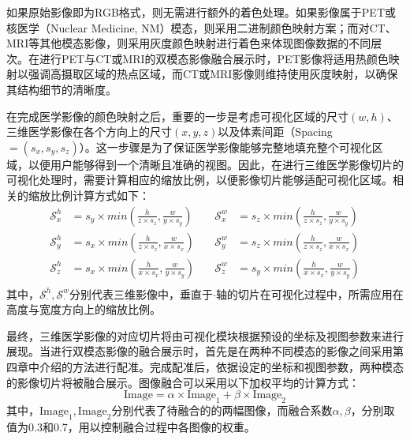 如果原始影像即为RGB格式，则无需进行额外的着色处理。如果影像属于PET或核医学（Nuclear Medicine, NM）模态，则采用二进制颜色映射方案；而对CT、MRI等其他模态影像，则采用灰度颜色映射进行着色来体现图像数据的不同层次。在进行PET与CT或MRI的双模态影像融合展示时，PET影像将适用热颜色映射以强调高摄取区域的热点区域，而CT或MRI影像则维持使用灰度映射，以确保其结构细节的清晰度。

在完成医学影像的颜色映射之后，重要的一步是考虑可视化区域的尺寸\((w,h)\)、三维医学影像在各个方向上的尺寸\((x,y,z)\)以及体素间距（Spacing\(=(s_x,s_y,s_z)\)）。这一步骤是为了保证医学影像能够完整地填充整个可视化区域，以便用户能够得到一个清晰且准确的视图。因此，在进行三维医学影像切片的可视化处理时，需要计算相应的缩放比例，以便影像切片能够适配可视化区域。相关的缩放比例计算方式如下：
\begin{equation}
    \begin{aligned}
        \mathcal{S}_x^{h} & = s_y \times min(\frac{h}{z \times s_z}, \frac{w}{y \times s_y}) & \quad \mathcal{S}_x^{w} & = s_z \times min(\frac{h}{z \times s_z}, \frac{w}{y \times s_y}) \\
        \mathcal{S}_y^{h} & = s_x \times min(\frac{h}{z \times s_z}, \frac{w}{x \times s_x}) & \quad \mathcal{S}_y^{w} & = s_z \times min(\frac{h}{z \times s_z}, \frac{w}{x \times s_x}) \\
        \mathcal{S}_z^{h} & = s_x \times min(\frac{h}{x \times s_x}, \frac{w}{y \times s_y}) & \quad \mathcal{S}_z^{w} & = s_y \times min(\frac{h}{x \times s_x}, \frac{w}{y \times s_y}) \\
    \end{aligned}
    \label{eq:chap05_scale}
\end{equation}
其中，\(\mathcal{S}_\cdot^{h},\mathcal{S}_\cdot^{w}\)分别代表三维影像中，垂直于\(\cdot\)轴的切片在可视化过程中，所需应用在高度与宽度方向上的缩放比例。

最终，三维医学影像的对应切片将由可视化模块根据预设的坐标及视图参数来进行展现。当进行双模态影像的融合展示时，首先是在两种不同模态的影像之间采用第四章中介绍的方法进行配准。完成配准后，依据设定的坐标和视图参数，两种模态的影像切片将被融合展示。图像融合可以采用以下加权平均的计算方式：
\begin{equation}
    \text{Image} = \alpha \times \text{Image}_1 + \beta \times \text{Image}_2
    \label{eq:chap05_fusion}
\end{equation}
其中，\(\text{Image}_1,\text{Image}_2\)分别代表了待融合的的两幅图像，而融合系数\(\alpha, \beta\)，分别取值为0.3和0.7，用以控制融合过程中各图像的权重。

